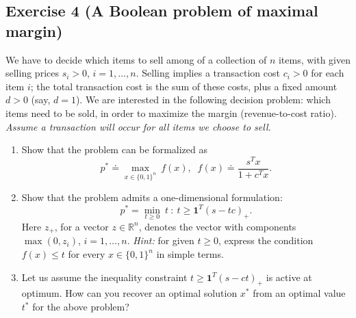 \documentclass[11pt]{article}
\begin{document}
\newpage
\subsection*{Exercise 4 (A Boolean problem of maximal margin)}

We have to decide which items to sell among of a collection of $n$ items, with given selling prices $s_i>0$, $i=1,\ldots,n$. Selling implies a transaction cost $c_i>0$ for each item $i$; the total transaction cost is the sum of these costs, plus a fixed amount $d>0$ (say, $d=1$). We are interested in the following decision problem: which items need to be sold, in order to maximize the margin (revenue-to-cost ratio). \textit{Assume a transaction will occur for all items we choose to sell.}

\begin{enumerate}
    \item Show that the problem can be formalized as
    \[
    p^* \doteq \max_{x \in \{0,1\}^n} \: f(x), \;\; f(x) \doteq \frac{s^T x}{1+c^T x} .
    \]

    \item Show that the problem admits a one-dimensional formulation:
    \[
    p^* = \min_{t \ge 0} \: t ~:~ t  \ge \mathbf{1}^T (s-tc)_+.
    \]
    Here $z_+$, for a vector $z \in \mathbb{R}^{n}$, denotes the vector with components $\max(0,z_i)$, $i=1,\ldots,n$. {\em Hint:} for given $t \ge 0$, express the condition $f(x) \le t$ for every $x \in \{0,1\}^n$ in simple terms.

    \item Let us assume the inequality constraint $t \ge \mathbf{1}^T (s-ct)_+$ is active at optimum. How can you recover an optimal solution $x^*$ from an optimal value $t^*$ for the above problem?
\end{enumerate}
\end{document}
